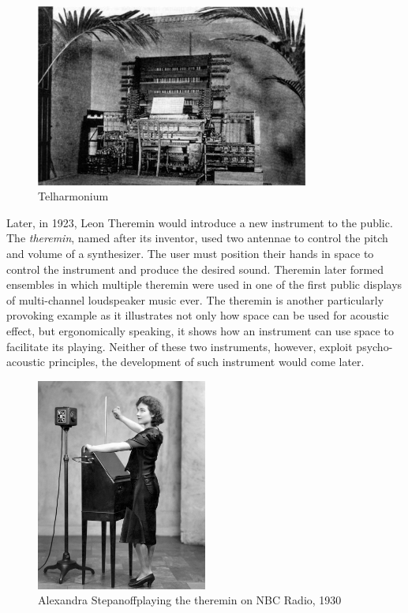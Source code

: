 \begin{figure}[ht!]%
\centering
\includegraphics[width=0.8\textwidth]{img/telharmonium.jpg} 
\caption{Telharmonium \cite{Telharmo82:online}}
\end{figure}

Later, in 1923, Leon Theremin would introduce a new instrument to the public. The \textit{theremin}, named after its inventor, used two antennae to control the pitch and volume of a synthesizer. The user must position their hands in space to control the instrument and produce the desired sound. Theremin later formed ensembles in which multiple theremin were used in one of the first public displays of multi-channel loudspeaker music ever. The theremin is another particularly provoking example as it illustrates not only how space can be used for acoustic effect, but ergonomically speaking, it shows how an instrument can use space to facilitate its playing. Neither of these two instruments, however, exploit psycho-acoustic principles, the development of such instrument would come later. %

\begin{figure}[h!]%
\centering
\includegraphics[width=0.5\textwidth]{img/theremin.jpg} 
\caption{Alexandra Stepanoff\protect\footnotemark playing the theremin on NBC Radio, 1930 \cite{Theramin45:online}}
\end{figure}

